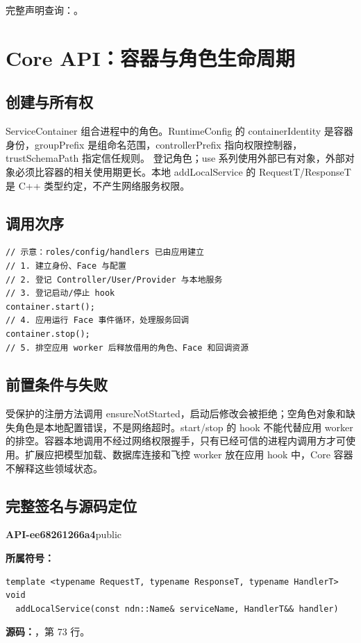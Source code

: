 完整声明查询：。

\section{Core API：容器与角色生命周期}

\subsection{创建与所有权}
ServiceContainer 组合进程中的角色。RuntimeConfig 的 containerIdentity 是容器身份，groupPrefix 是组命名范围，controllerPrefix 指向权限控制器，trustSchemaPath 指定信任规则。 登记角色；use 系列使用外部已有对象，外部对象必须比容器的相关使用期更长。本地 addLocalService 的 RequestT/ResponseT 是 C++ 类型约定，不产生网络服务权限。

\subsection{调用次序}

\begin{Verbatim}[fontsize=\footnotesize,breaklines,breakanywhere]
// 示意：roles/config/handlers 已由应用建立
// 1. 建立身份、Face 与配置
// 2. 登记 Controller/User/Provider 与本地服务
// 3. 登记启动/停止 hook
container.start();
// 4. 应用运行 Face 事件循环，处理服务回调
container.stop();
// 5. 排空应用 worker 后释放借用的角色、Face 和回调资源
\end{Verbatim}

\subsection{前置条件与失败}
受保护的注册方法调用 ensureNotStarted，启动后修改会被拒绝；空角色对象和缺失角色是本地配置错误，不是网络超时。start/stop 的 hook 不能代替应用 worker 的排空。容器本地调用不经过网络权限握手，只有已经可信的进程内调用方才可使用。扩展应把模型加载、数据库连接和飞控 worker 放在应用 hook 中，Core 容器不解释这些领域状态。

\subsection{完整签名与源码定位}

\textbf{API-ee68261266a4}\quad public\par
\textbf{所属符号：}\par
\begin{Verbatim}[fontsize=\footnotesize,breaklines,breakanywhere]
template <typename RequestT, typename ResponseT, typename HandlerT>
void
  addLocalService(const ndn::Name& serviceName, HandlerT&& handler)
\end{Verbatim}
\textbf{源码：}，第 73 行。\par

